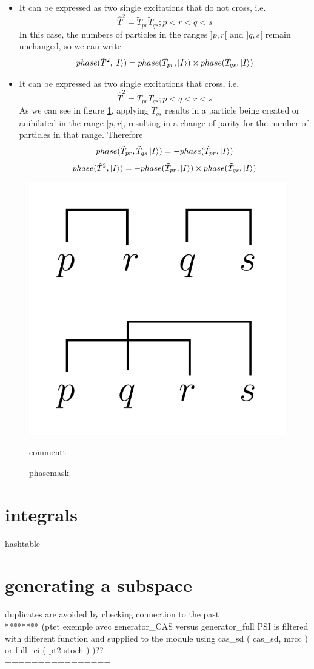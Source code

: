 \begin{itemize}
\item
It can be expressed as two single excitations that do not cross, i.e.
$$\hat T^2=\tilde T_{pr} \tilde T_{qs};p<r<q<s$$
In this case, the numbers of particles in the ranges $]p, r[$ and $]q, s[$ remain unchanged, so we can write
$$phase(\hat T^2, \ket I) = phase(\tilde T_{pr}, \ket I) \times phase(\tilde T_{qs}, \ket I) $$

\item
It can be expressed as two single excitations that cross, i.e.
$$\hat T^2=\tilde T_{pr} \tilde T_{qs};p<q<r<s$$
As we can see in figure \ref{fig:biphasefactor}, applying  $\tilde T_{qs}$ results in a particle being created or anihilated in the range $]p,r[$, resulting in a change of parity for the number of particles in that range. Therefore
$$phase(\tilde T_{pr}, \tilde T_{qs} \ket I) = -phase(\tilde T_{pr}, \ket I)$$ 
$$phase(\hat T^2, \ket I) = -phase(\tilde T_{pr}, \ket I) \times phase(\tilde T_{ qs}, \ket I) $$
\end{itemize}



\begin{figure}[h!]
	\begin{center}
		\includegraphics[width=0.4\columnwidth]{figures/determinant_driven/biphasefactor}
		\caption{
		\label{fig:biphasefactor}%
		phasemask
		}
		commentt
	\end{center}
\end{figure}



\section{integrals}
hashtable \\

\section{generating a subspace}
duplicates are avoided by checking connection to the past \\
******** (ptet exemple avec generator\_CAS versus generator\_full PSI is filtered with different function and supplied to the module using cas\_sd ( cas\_sd, mrcc ) or full\_ci ( pt2 stoch ) )?? \\
================

